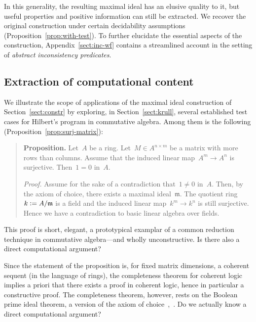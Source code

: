 \documentclass[com,11pt,crcready]{iosart2x}
\theoremstyle{definition}
\theoremstyle{plain}
\theoremstyle{remark}
\newcommand{\mmm}{\mathfrak{m}}
\newcommand{\defeq}{\vcentcolon=}
\renewcommand{\_}{\mathpunct{.}\,}
\begin{document}
In this generality, the resulting
maximal ideal has an elusive quality to it, but useful properties and positive information can still be
extracted. We recover the original construction under certain
decidability assumptions (Proposition~\ref{prop:with-test}). To further
elucidate the essential aspects of the construction, Appendix~\ref{sect:inc-wf}
contains a streamlined account in the setting of \emph{abstract inconsistency
predicates}.


\subsection*{Extraction of computational content} We illustrate the scope of
applications of the maximal ideal construction of Section~\ref{sect:constr} by
exploring, in Section~\ref{sect:krull}, several established test cases for
Hilbert's program in commutative algebra. Among them is the following
(Proposition~\ref{prop:surj-matrix}):
\begin{quote}\small
\textbf{Proposition.} Let~$A$ be a ring. Let~$M \in A^{n \times m}$ be a matrix with more rows
than columns. Assume that the induced linear map~$A^m \to A^n$ is surjective.
Then~$1 = 0$ in~$A$.
\smallskip

\emph{Proof.} Assume for the sake of a contradiction that~$1 \neq 0$ in~$A$.
Then, by the axiom of choice, there exists a maximal ideal~$\mmm$. The quotient
ring~$k \defeq A/\mmm$ is a field and the induced linear map~$k^m \to k^n$ is
still surjective. Hence we have a contradiction to basic linear algebra over fields.
\end{quote}
This proof is short, elegant, a prototypical examplar of a common reduction
technique in commutative algebra---and wholly unconstructive. Is there also a
direct computational argument?

Since the statement of the proposition is, for fixed matrix dimensions, a
coherent sequent (in the language of rings), the completeness
theorem for coherent logic~\cite[Corollary~D1.5.10]{johnstone:elephant} implies a priori that there exists a proof in
coherent logic, hence in particular a constructive proof. The completeness
theorem, however, rests on the Boolean prime ideal theorem, a version of the
axiom of choice~\cite[Remark~D1.5.11]{johnstone:elephant},~\cite{scott:prime,henkin:metamath,banaschewski:ultrafilter}. Do we actually know a direct computational argument?
\end{document}
